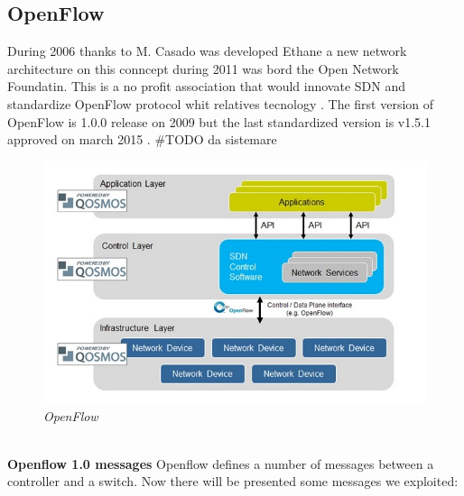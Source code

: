 \documentclass[conference,10pt]{IEEEtran}
\begin{document}
  \subsection{OpenFlow}
  During 2006 thanks to M. Casado was developed Ethane a new network architecture on this conncept during 2011 was bord the Open Network Foundatin.
  This is a no profit association that would innovate SDN and standardize OpenFlow protocol whit relatives tecnology \cite{ONF}.
  The first version of OpenFlow is 1.0.0 release on 2009 but the last standardized version is v1.5.1 approved on march 2015 \cite{ONF_report}.
  \#TODO da sistemare
\begin{figure}[!h]
 \centering
 \includegraphics[scale=0.58]{images/of.jpg}
 \caption{\emph{OpenFlow}}
 \label{fig:topo}
\end{figure}
  \\
  \textbf{Openflow 1.0 messages}
Openflow defines a number of messages between a controller and a switch. Now there will be presented some messages we exploited:\cite{openflow}
\end{document}
